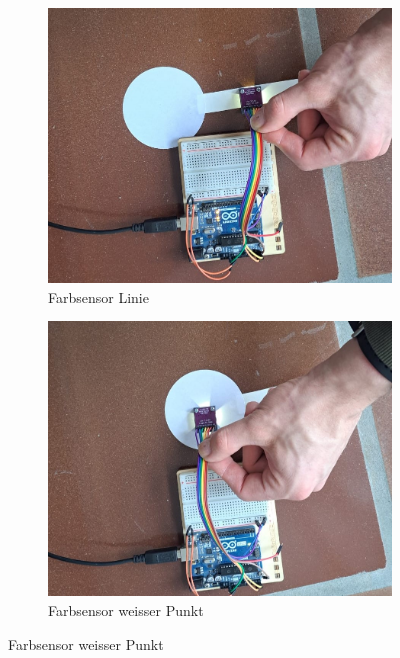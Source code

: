 \begin{figure}[H]
    \centering
    \begin{subfigure}{0.3\textwidth} %
        \centering
        \includegraphics[width=\linewidth]{img/sensortest/Farbsensor_Linie.jpg}
        \caption{Farbsensor Linie}
        \label{fig:FarbsensorLinie}
    \end{subfigure}
    \begin{subfigure}{0.3\textwidth}
        \centering
        \includegraphics[width=\linewidth]{img/sensortest/Farbsensor_WeisserPunkt.jpg}
        \caption{Farbsensor weisser Punkt}
        \label{fig:FarbsensorWeisserPunkt}
    \end{subfigure}
    

\end{figure}
